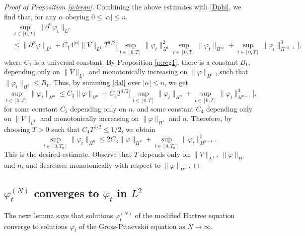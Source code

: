 \documentclass[11pt,a4paper,draft,DIV11]{scrartcl}	%
\newcommand{\ph}{\varphi_t^{(N)}}	%
\begin{document}
\begin{proof}[Proof of Proposition \ref{p:lregn}]
  
  Combining the above estimates with \eqref{Dphi}, we find that, for any
  $\alpha$ obeying $0 \le |\alpha| \le n$,
  \begin{equation} \label{dal}
    \begin{split}
      & \sup_{t \in [0,T]} \| \partial^\alpha \varphi_t \|_{L^2} \\
      & \le \| \partial^\alpha \varphi \|_{L^2} + C_1 4^{|\alpha|} \| V
      \|_{L^1} T^{1/2} \Big[ \sup_{t \in [0,T]} \| \varphi_t \|_{H^1}^2
      \sup_{t \in [0,T]} \| \varphi_t \|_{H^{|\alpha|}} + \sup_{t \in [0,T]}
      \| \varphi_t \|_{H^{|\alpha|-1}}^3 \Big],
    \end{split}
  \end{equation}
  where $C_1$ is a universal constant. By Proposition \ref{p:reg1}, there is a
  constant $B_1$, depending only on $\| V \|_{L^1}$ and monotonically
  increasing on $\| \varphi \|_{H^1}$, such that $\| \varphi_t \|_{H^1} \le
  B_1$. Thus, by summing \eqref{dal} over $|\alpha| \le n$, we get
  \[
    \sup_{t \in [0,T]} \| \varphi_t \|_{H^n} \le C_3 \| \varphi \|_{H^n} +
    C_4 T^{1/2} \Big[ \sup_{t \in [0,T]} \| \varphi_t \|_{H^n} + \sup_{t \in
    [0,T]} \| \varphi_t \|_{H^{n-1}}^3 \Big],
  \]
  for some constant $C_3$ depending only on $n$, and some constant $C_4$
  depending only on $\| V \|_{L^1}$ and monotonically increasing on $\|
  \varphi \|_{H^1}$ and $n$. Therefore, by choosing $T > 0$ such that $C_4
  T^{1/2} \le 1/2$, we obtain
  \[
    \sup_{t \in [0,T_n]} \| \varphi_t \|_{H^n} \le 2 C_3 \| \varphi \|_{H^n}
    + \sup_{t \in [0,T_n]} \| \varphi_t \|_{H^{n-1}}^3.
  \]
  This is the desired estimate. Observe that $T$ depends only on $\| V
  \|_{L^1}$, $\| \varphi \|_{H^1}$ and $n$, and decreases monotonically with
  respect to $\| \varphi \|_{H^1}$.
\end{proof}


\subsection{$\ph$ converges to $\varphi_t$ in $L^2$}


The next lemma says that solutions $\varphi_t^{(N)}$ of the modified Hartree
equation converge to solutions $\varphi_t$ of the Gross-Pitaevskii equation
as $N \to \infty$.
\end{document}
